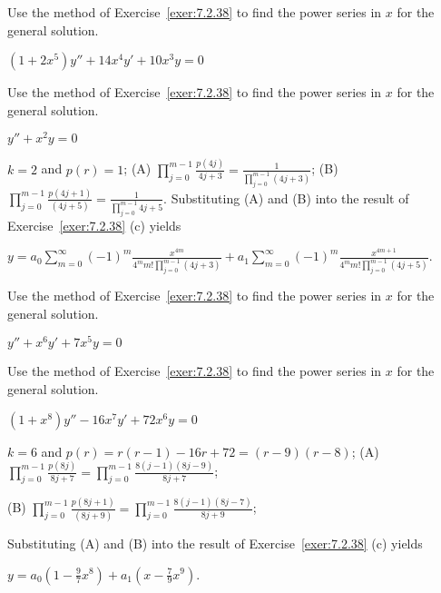 \documentclass{ximera}
\begin{document}
\begin{problem}\label{exer:7.2.39}
Use the method of
Exercise~\ref{exer:7.2.38}  to find the power series in $x$
 for the general solution.
 
$(1+2x^5)y''+14x^4y'+10x^3y=0$
\end{problem}

\begin{problem}\label{exer:7.2.40} Use the method of
Exercise~\ref{exer:7.2.38}  to find the power series in $x$
 for the general solution.
 
 $y''+x^2y=0$

 \begin{solution}
     $k=2$ and
$p(r)=1$;
(A) $\prod_{j=0}^{m-1}\frac{p(4j)}{4j+3}=
\frac{1}{\prod_{j=0}^{m-1}(4j+3)}$;
(B) $\prod_{j=0}^{m-1}\frac{p(4j+1)}{(4j+5)}=
\frac{1}{\prod_{j=0}^{m-1}4j+5}$.
Substituting (A) and (B) into the
result of Exercise~\ref{exer:7.2.38} (c) yields

$y=a_0\sum_{m=0}^\infty
(-1)^m\frac{x^{4m}}{4^mm!\prod_{j=0}^{m-1}(4j+3)}+a_1\sum_{m=0}^\infty
(-1)^m\frac{x^{4m+1}}{4^mm!\prod_{j=0}^{m-1}(4j+5)}$.
 \end{solution}
\end{problem}

\begin{problem}\label{exer:7.2.41}  
Use the method of
Exercise~\ref{exer:7.2.38}  to find the power series in $x$
 for the general solution.
 
$y''+x^6y'+7x^5y=0$
\end{problem}

\begin{problem}\label{exer:7.2.42}
Use the method of
Exercise~\ref{exer:7.2.38}  to find the power series in $x$
 for the general solution.
 
 $(1+x^8)y''-16x^7y'+72x^6y=0$

 \begin{solution}
     $k=6$ and
$p(r)=r(r-1)-16r+72=(r-9)(r-8) $;
(A) $\prod_{j=0}^{m-1}\frac{p(8j)}{8j+7}=
\prod_{j=0}^{m-1}\frac{8(j-1)(8j-9)}{8j+7}$;


(B) $\prod_{j=0}^{m-1}\frac{p(8j+1)}{(8j+9)}=
\prod_{j=0}^{m-1}\frac{8(j-1)(8j-7)}{8j+9}$;

Substituting (A) and (B) into the
result of Exercise~\ref{exer:7.2.38} (c) yields


$y=a_0\left(1-\frac{9}{7}x^8\right)+a_1\left(x-\frac{7}{9}x^9\right)$.

 \end{solution}
\end{problem}
\end{document}
